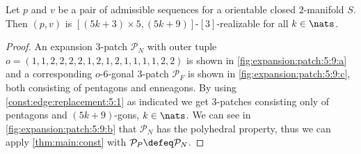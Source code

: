 \begin{theorem}
  Let $p$ and $v$ be a pair of admissible sequences for a orientable closed $2$-manifold $S$. Then $(p, v)$ is $[(5k + 3) \times 5, (5k+9)]$-$[3]$-realizable for all $k \in \nats$.
  \begin{proof}
    An expansion $3$-patch $\mathcal{P}_N$ with outer tuple $o = (1, 1, 2, 2, 2, 2, 1, 2, 1, 2, 1, 1, 1, 1, 2, 2)$ is shown in \autoref{fig:expansion:patch:5:9:a} and a corresponding $o$-$6$-gonal $3$-patch $\mathcal{P}_F$ is shown in \autoref{fig:expansion:patch:5:9:c}, both consisting of pentagons and enneagons. By using \autoref{const:edge:replacement:5:1} as indicated we get $3$-patches consisting only of pentagons and $(5k+9)$-gons, $k \in \nats$. We can see in \autoref{fig:expansion:patch:5:9:b} that $\mathcal{P}_N$ has the polyhedral property, thus we can apply \autoref{thm:main:const} with $\mathcal{P}_P \defeq \mathcal{P}_N$.
  \end{proof}
\end{theorem}
